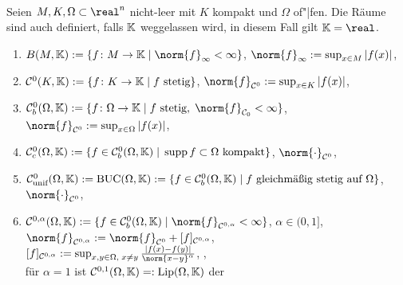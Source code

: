 \begin{Bsp}
    \\
    Seien $M, K, \Omega \subset \real^n$ nicht-leer mit $K$ kompakt und $\Omega$ of"|fen.
    Die Räume sind auch definiert, falls $\mathbb{K}$ weggelassen wird, in diesem Fall gilt
    $\KK = \real$.
    \begin{enumerate}[label=\emph{(\alph*)}]
        \item
        $B(M, \KK) := \{f\colon M \rightarrow \KK \;|\; \norm{f}_\infty < \infty\}$,
        $\norm{f}_\infty := \sup_{x \in M} |f(x)|$,\\
        
        \item
        $\mathcal{C}^0(K, \mathbb{K}) := \{f\colon K \rightarrow \mathbb{K} \;|\; f \text{ stetig}\}$,
        $\norm{f}_{\C^0} := \sup_{x \in K} |f(x)|$,\\
        
        \item
        $\C^0_b(\Omega, \KK) := \{f\colon \Omega \rightarrow \KK \;|\; f \text{ stetig},\;
        \norm{f}_{\C_0} < \infty\}$,
        $\norm{f}_{\C^0} := \sup_{x \in \Omega} |f(x)|$,\\
        
        \item
        $\mathcal{C}^0_c(\Omega, \mathbb{K}) := \{f \in \mathcal{C}^0_b(\Omega, \mathbb{K}) \;|\;
        \operatorname{supp} f \subset \Omega \text{ kompakt}\}$,
        $\norm{\cdot}_{\C^0}$,\\
        
        \item
        $\mathcal{C}^0_{\text{unif}}(\Omega, \mathbb{K}) := \text{BUC}(\Omega, \mathbb{K}) := \{f \in \mathcal{C}^0_b(\Omega, \mathbb{K}) \;|\;
        f \text{ gleichmäßig stetig auf } \Omega\}$,
        $\norm{\cdot}_{\C^0}$,\\
        
        \item
        $\C^{0,\alpha}(\Omega, \KK) := \{f \in \C^0_b(\Omega, \KK) \;|\;
        \norm{f}_{\C^{0,\alpha}} < \infty\}$, $\alpha \in (0, 1]$,
        $\norm{f}_{\C^{0,\alpha}} := \norm{f}_{\C^0} + [f]_{\C^{0,\alpha}}$,\\
        $[f]_{\C^{0,\alpha}} := \sup_{x, y \in \Omega,\; x \not= y}
        \frac{|f(x) - f(y)|}{\norm{x - y}^\alpha}$,
        ,\\
        für $\alpha = 1$ ist
        $\mathcal{C}^{0,1}(\Omega, \mathbb{K}) =: \text{Lip}(\Omega, \mathbb{K})$
        der 
        

\end{enumerate}
\end{Bsp}
